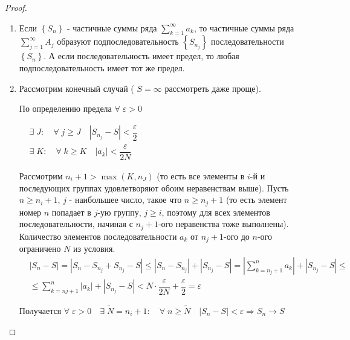 \documentclass[../main.tex]{subfiles}
\begin{document}
\begin{proof}
    
    ~

    \begin{enumerate}
        \item Если \( \left\{ S_n\right\}\) - частичные суммы ряда \( \sum\limits_{ k=1}^{ \infty } a_k\), то частичные суммы ряда \( \sum\limits_{ j=1}^{ \infty } A_j\) образуют подпоследовательность \( \left\{ S_{n_j}\right\}\) последовательности \( \left\{ S_n\right\}\). А если последовательность имеет предел, то любая подпоследовательность имеет тот же предел.
        \item Рассмотрим конечный случай ( \( S= \infty \) рассмотреть даже проще).
        \par По определению предела \( \forall \; \varepsilon >0\) \par 
        \( \begin{aligned}
            &\exists \; J:\quad \forall \; j \geq  J\quad \left| S_{n_j}-S\right|< \dfrac{ \varepsilon}{ 2}\\ 
            &\exists \; K:\quad \forall \; k \geq  K\quad \left| a_k\right| < \dfrac{ \varepsilon}{ 2N} 
        \end{aligned}\)
        \par Рассмотрим \( n_i + 1> \max\limits_{ } (K, n_{J})\) (то есть все элементы в \(i\)-й и последующих группах удовлетворяют обоим неравенствам выше). Пусть \( n \geq n_i+1\), \( j\) - наибольшее число, такое что \( n \geq n_j+1\) (то есть элемент номер \( n\) попадает в \( j\)-ую группу, \( j \geq i\), поэтому для всех элементов последовательности, начиная с \( n_j+1\)-ого неравенства тоже выполнены). Количество элементов последовательности \( a_k\) от \( n_{j}+1\)-ого до \( n\)-ого ограничено \( N\) из условия. 
        \begin{equation*}
            \begin{aligned}
                &\left| S_n-S\right|=\left| S_n-S_{n_j}+S_{n_j}-S\right| \leq \left| S_n-S_{n_j}\right|+\left| S_{n_j}-S\right|= \left|\sum\limits_{ k=n_{j}+1}^{ n} a_k \right| + \left| S_{n_j}-S\right| \leq \\ 
                & \leq \sum\limits_{ k=n{j}+1}^{ n} \left| a_k\right| + \left| S_{n_j}-S\right| < N\cdot \dfrac{ \varepsilon}{ 2N} + \dfrac{ \varepsilon}{ 2} = \varepsilon   
            \end{aligned}
        \end{equation*}
        \par Получается \( \forall \; \varepsilon >0\quad \exists \; \tilde{ N}=n_i+1:\quad \forall \; n \geq \tilde{ N}\quad \left| S_n-S\right|< \varepsilon \Longrightarrow S_n \longrightarrow S\)

\end{enumerate}
\end{proof}
\end{document}
